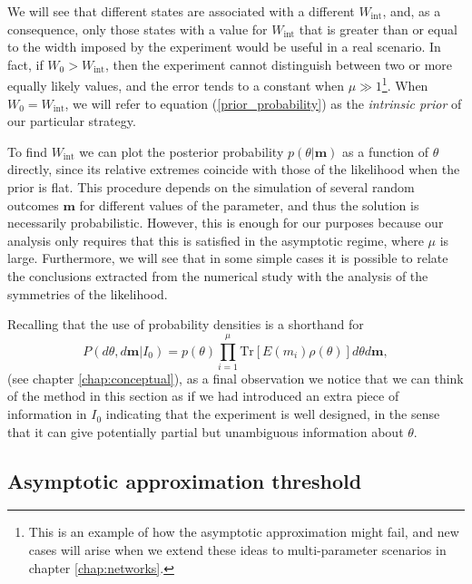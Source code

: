 We will see that different states are associated with a different $W_{\mathrm{int}}$, and, as a consequence, only those states with a value for $W_{\mathrm{int}}$ that is greater than or equal to the width imposed by the experiment would be useful in a real scenario. In fact, if $W_0 > W_{\mathrm{int}}$, then the experiment cannot distinguish between two or more equally likely values, and the error tends to a constant when $\mu \gg 1$\footnote{This is an example of how the asymptotic approximation might fail, and new cases will arise when we extend these ideas to multi-parameter scenarios in chapter \ref{chap:networks}.}. When $W_0 = W_{\mathrm{int}}$, we will refer to equation (\ref{prior_probability}) as the \emph{intrinsic prior} of our particular strategy.

To find $W_{\mathrm{int}}$ we can plot the posterior probability $p(\theta| \boldsymbol{m})$ as a function of $\theta$ directly, since its relative extremes coincide with those of the likelihood when the prior is flat. This procedure depends on the simulation of several random outcomes $\boldsymbol{m}$ for different values of the parameter, and thus the solution is necessarily probabilistic. However, this is enough for our purposes because our analysis only requires that this is satisfied in the asymptotic regime, where $\mu$ is large. Furthermore, we will see that in some simple cases it is possible to relate the conclusions extracted from the numerical study with the analysis of the symmetries of the likelihood.

Recalling that the use of probability densities is a shorthand for
\begin{equation}
P(d\theta, d\boldsymbol{m} | I_0) = p(\theta)\prod_{i=1}^\mu\mathrm{Tr}[E(m_i)\rho(\theta)] d\theta d\boldsymbol{m},
\end{equation}
(see chapter \ref{chap:conceptual}), as a final observation we notice that we can think of the method in this section as if we had introduced an extra piece of information in $I_0$ indicating that the experiment is well designed, in the sense that it can give potentially partial but unambiguous information about $\theta$.  

\subsection{Asymptotic approximation threshold}
\label{subsec:asymsatu}

